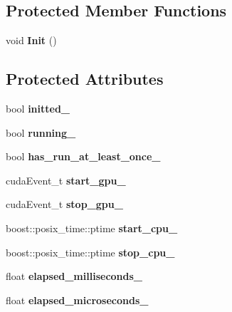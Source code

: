 \subsection*{Protected Member Functions}
\begin{DoxyCompactItemize}
\item 
void {\bfseries Init} ()\hypertarget{classcaffe_1_1Timer_a9e5e1052cb6ea672940a300dc630c6c9}{}\label{classcaffe_1_1Timer_a9e5e1052cb6ea672940a300dc630c6c9}

\end{DoxyCompactItemize}
\subsection*{Protected Attributes}
\begin{DoxyCompactItemize}
\item 
bool {\bfseries initted\+\_\+}\hypertarget{classcaffe_1_1Timer_a2b39366d547f7a5638f53df589624def}{}\label{classcaffe_1_1Timer_a2b39366d547f7a5638f53df589624def}

\item 
bool {\bfseries running\+\_\+}\hypertarget{classcaffe_1_1Timer_a44483462010588661ce927c3b3ef6c3d}{}\label{classcaffe_1_1Timer_a44483462010588661ce927c3b3ef6c3d}

\item 
bool {\bfseries has\+\_\+run\+\_\+at\+\_\+least\+\_\+once\+\_\+}\hypertarget{classcaffe_1_1Timer_a5a8439af494a4874ce47b6334bdb7da6}{}\label{classcaffe_1_1Timer_a5a8439af494a4874ce47b6334bdb7da6}

\item 
cuda\+Event\+\_\+t {\bfseries start\+\_\+gpu\+\_\+}\hypertarget{classcaffe_1_1Timer_aaeef1178d30cea3cebf7a4a0eac02e6f}{}\label{classcaffe_1_1Timer_aaeef1178d30cea3cebf7a4a0eac02e6f}

\item 
cuda\+Event\+\_\+t {\bfseries stop\+\_\+gpu\+\_\+}\hypertarget{classcaffe_1_1Timer_a7802204485bd7825f8bd7fad90bbdfd7}{}\label{classcaffe_1_1Timer_a7802204485bd7825f8bd7fad90bbdfd7}

\item 
boost\+::posix\+\_\+time\+::ptime {\bfseries start\+\_\+cpu\+\_\+}\hypertarget{classcaffe_1_1Timer_a3cbebb809a42eda35357bdc7363b9afc}{}\label{classcaffe_1_1Timer_a3cbebb809a42eda35357bdc7363b9afc}

\item 
boost\+::posix\+\_\+time\+::ptime {\bfseries stop\+\_\+cpu\+\_\+}\hypertarget{classcaffe_1_1Timer_acca9361263d52a7e28d291933220e2f5}{}\label{classcaffe_1_1Timer_acca9361263d52a7e28d291933220e2f5}

\item 
float {\bfseries elapsed\+\_\+milliseconds\+\_\+}\hypertarget{classcaffe_1_1Timer_a7aa3bf3a38cde89a068e48fee8b1c623}{}\label{classcaffe_1_1Timer_a7aa3bf3a38cde89a068e48fee8b1c623}

\item 
float {\bfseries elapsed\+\_\+microseconds\+\_\+}\hypertarget{classcaffe_1_1Timer_a3b16e3ffae9ce82acfb50b44377d611f}{}\label{classcaffe_1_1Timer_a3b16e3ffae9ce82acfb50b44377d611f}

\end{DoxyCompactItemize}


